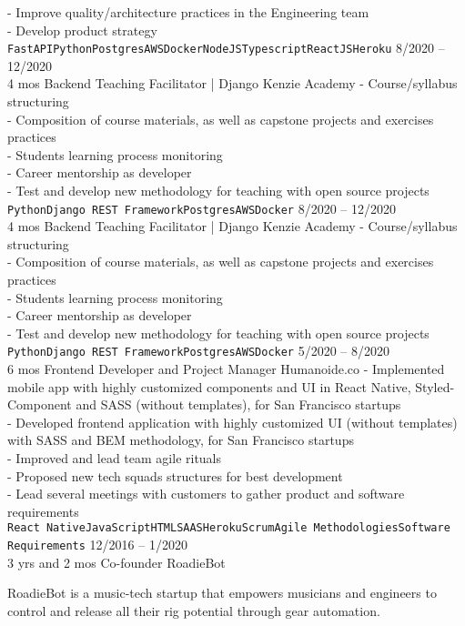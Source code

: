 \documentclass[9pt]{developercv} %
\begin{document}
\begin{entrylist}
{- Improve quality/architecture practices in the Engineering team\\
- Develop product strategy
\\\texttt{FastAPI}\slashsep\texttt{Python}\slashsep\texttt{Postgres}\slashsep\texttt{AWS}\slashsep\texttt{Docker}\slashsep\texttt{NodeJS}\slashsep\texttt{Typescript}\slashsep\texttt{ReactJS}\slashsep\texttt{Heroku}}
	\entry
		{8/2020 -- 12/2020\\\footnotesize{4 mos}}
		{Backend Teaching Facilitator | Django}
		{Kenzie Academy}
		{- Course/syllabus structuring\\
- Composition of course materials, as well as capstone projects and exercises practices\\
- Students learning process monitoring\\
- Career mentorship as developer\\
- Test and develop new methodology for teaching with open source projects
\\\texttt{Python}\slashsep\texttt{Django REST Framework}\slashsep\texttt{Postgres}\slashsep\texttt{AWS}\slashsep\texttt{Docker}}
	\entry
		{8/2020 -- 12/2020\\\footnotesize{4 mos}}
		{Backend Teaching Facilitator | Django}
		{Kenzie Academy}
		{- Course/syllabus structuring\\
- Composition of course materials, as well as capstone projects and exercises practices\\
- Students learning process monitoring\\
- Career mentorship as developer\\
- Test and develop new methodology for teaching with open source projects
\\\texttt{Python}\slashsep\texttt{Django REST Framework}\slashsep\texttt{Postgres}\slashsep\texttt{AWS}\slashsep\texttt{Docker}}
	\entry
		{5/2020 -- 8/2020\\\footnotesize{6 mos}}
		{Frontend Developer and Project Manager}
		{Humanoide.co}
		{- Implemented mobile app with highly customized components and UI in React Native, Styled-Component and SASS (without templates), for San Francisco startups\\
- Developed frontend application with highly customized UI (without templates) with SASS and BEM methodology, for San Francisco startups\\
- Improved and lead team agile rituals \\
- Proposed new tech squads structures for best development \\
- Lead several meetings with customers to gather product and software requirements
\\\texttt{React Native}\slashsep\texttt{JavaScript}\slashsep\texttt{HTML}\slashsep\texttt{SAAS}\slashsep\texttt{Heroku}\slashsep\texttt{Scrum}\slashsep\texttt{Agile Methodologies}\slashsep\texttt{Software Requirements}}
	\entry
		{12/2016 -- 1/2020\\\footnotesize{3 yrs and 2 mos}}
		{Co-founder}
		{RoadieBot}
		{RoadieBot is a music-tech startup that empowers musicians and engineers to control and release all their rig potential through gear automation.

}
\end{entrylist}
\end{document}
